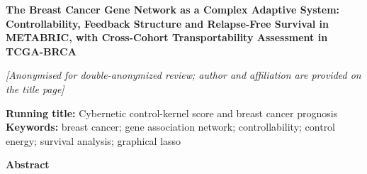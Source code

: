 \documentclass[12pt]{article}
\begin{document}
\begin{center}
{\LARGE\bfseries The Breast Cancer Gene Network as a Complex
Adaptive System: Controllability, Feedback Structure and Relapse-Free
Survival in METABRIC, with Cross-Cohort Transportability Assessment in
TCGA-BRCA}
\end{center}

\vspace{0.4em}
\begin{center}
\textit{[Anonymised for double-anonymized review; author and affiliation
are provided on the title page]}\\
\end{center}

\vspace{0.4em}
\begin{center}
\textbf{Running title:} Cybernetic control-kernel score and breast cancer
prognosis\\
\textbf{Keywords:} breast cancer; gene association network; controllability;
control energy; survival analysis; graphical lasso
\end{center}

\vspace{0.6em}

\begin{center}
\textbf{Abstract}
\end{center}
\end{document}
